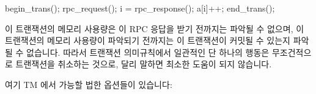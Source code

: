 \fi

\begin{VerbatimN}[samepage=true]
begin_trans();
rpc_request();
i = rpc_response();
a[i]++;
end_trans();
\end{VerbatimN}

이 트랜잭션의 메모리 사용량은 이 RPC 응답을 받기 전까지는 파악될 수 없으며, 이
트랜잭션의 메모리 사용량이 파악되기 전까지는 이 트랜잭션이 커밋될 수 있는지
파악될 수 없습니다.
따라서 트랜잭션 의미규칙에서 일관적인 단 하나의 행동은 무조건적으로 트랜잭션을
취소하는 것으로, 달리 말하면 최소한 도움이 되지 않습니다.

여기 TM 에서 가능할 법한 옵션들이 있습니다:

